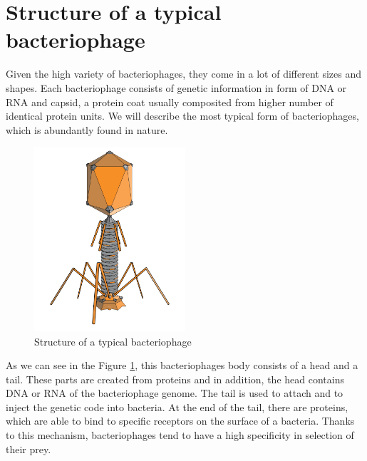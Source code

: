 \section{Structure of a typical bacteriophage}
Given the high variety of bacteriophages, they come in a lot of different sizes and shapes.
Each bacteriophage consists of genetic information in form of DNA or RNA and capsid, a protein coat usually composited from higher number of identical protein units.
We will describe the most typical form of bacteriophages, which is abundantly found in nature.

\begin{figure}[h]
\includegraphics[width=0.5\textwidth]{./images/phage.png}
\centering
\caption{Structure of a typical bacteriophage
}
\label{fig:phage}
\end{figure}


As we can see in the Figure \ref{fig:phage}, this bacteriophages body consists of a head and a tail.
These parts are created from proteins and in addition, the head contains DNA or RNA of the bacteriophage genome.
The tail is used to attach and to inject the genetic code into bacteria.
At the end of the tail, there are proteins, which are able to bind to specific receptors on the surface of a bacteria.
Thanks to this mechanism, bacteriophages tend to have a high specificity in selection of their prey.


